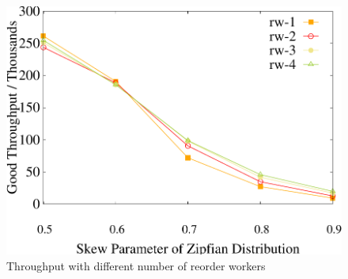 \begin{figure}[t]
    \begin{minipage}[b]{0.32\linewidth}
	\centering
	\includegraphics[width=\textwidth]{./exp_fig/reorder/tps}
	\vspace{-2em}
	\caption{Throughput with different number of reorder workers}
	\label{fig:reorder:tps}
	\end{minipage}    
    \vspace{-1em}
\end{figure}


